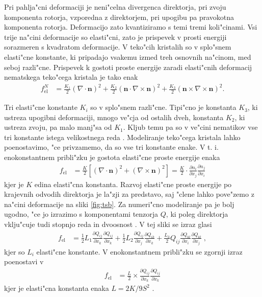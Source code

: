 \documentclass[12pt,twoside,openright,final]{report}
\renewcommand{\vec}{\mathbf}
\newcommand{\qodv}[2]{\ensuremath{\frac{\partial Q_{#1}}{\partial x_{#2}}}}
\newcommand{\nodv}[2]{\ensuremath{\frac{\partial n_{#1}}{\partial x_{#2}}}}
\begin{document}
Pri pahlja"cni deformaciji je neni"celna divergenca direktorja, pri zvoju komponenta rotorja, vzporedna z direktorjem, pri upogibu pa pravokotna komponenta rotorja. 
Deformacijo zato kvantiziramo s temi tremi koli"cinami. 
Vsi trije na"cini deformacije so elasti"cni, zato je prispevek v prosti energiji sorazmeren s kvadratom deformacije. 
V teko"cih kristalih so v splo"snem elasti"cne konstante, ki pripadajo vsakemu izmed treh osnovnih na"cinom, med seboj razli"cne. 
Prispevek k gostoti proste energije zaradi elasti"cnih deformacij nematskega teko"cega kristala je tako enak
\begin{align}
 f_{\mathrm{el}}^N &= \frac{K_1}{2} (\nabla \cdot \vec n)^2 + \frac{K_2}{2} (\vec n \cdot \nabla \times \vec n)^2 + \frac{K_3}{2} (\vec n \times \nabla \times \vec n)^2. 
\end{align}

Tri elasti"cne konstante $K_i$ so v splo"snem razli"cne. Tipi"cno je konstanta $K_3$, ki ustreza upogibni deformaciji, mnogo ve"cja od ostalih dveh, konstanta $K_2$, ki ustreza zvoju, pa malo manj"sa od $K_1$. 
Kljub temu pa so v ve"cini nematikov vse tri konstante istega velikostnega reda \cite{degennes}. 
Modeliranje teko"cega kristala lahko poenostavimo, "ce privzamemo, da so vse tri konstante enake. 
V t. i. enokonstantnem pribli"zku je gostota elasti"cne proste energije enaka
\begin{align}
 f_{\mathrm{el}} &= \frac{K}{2} \left[(\nabla \cdot \vec n)^2 + (\nabla \times \vec n)^2\right] = \frac{K}{2} \cdot \nodv{i}{j}\nodv{j}{i}
\end{align}
kjer je $K$ edina elasti"cna konstanta.
Razvoj elasti"cne proste energije po krajevnih odvodih direktorja je la"zji za predstavo, saj "clene lahko pove"zemo z na"cini deformacije na sliki \ref{fig:tsb}. 
Za numeri"cno modeliranje pa je bolj ugodno, "ce jo izrazimo s komponentami tenzorja $Q$, ki poleg direktorja vklju"cuje tudi stopnjo reda in dvoosnost \cite{copar-phd}. 
V tej sliki se izraz glasi
\begin{align}
 f_{\mathrm{el}} &= \frac{1}{2}L_1\qodv{ij}{k}\qodv{ij}{k} + \frac{1}{2}L_2 \qodv{ij}{j}\qodv{ik}{k} + \frac{L_3}{2}Q_{ij}\qodv{kl}{i}\qodv{kl}{j}\;,
\end{align}
kjer so $L_i$ elasti"cne konstante. V enokonstantnem pribli"zku se zgornji izraz poenostavi v 
\begin{align}
f_{\mathrm{el}} &= \frac{L}{2} \times \qodv{ij}{k}\qodv{ij}{k} 
\end{align}
kjer je elasti"cna konstanta enaka $L = 2K/9S^2$ \cite{ravnik-zumer-ldg}. 
\end{document}
